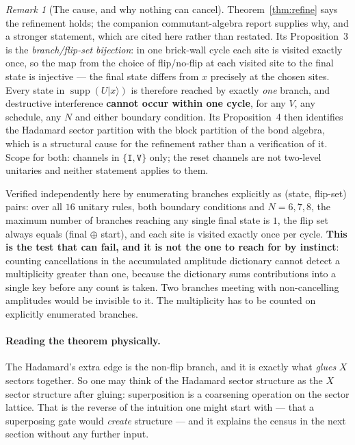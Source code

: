 \documentclass[11pt]{article}
\newcommand{\rt}[1]{\texttt{#1}}
\providecommand{\ket}[1]{|#1\rangle}
\theoremstyle{plain}
\theoremstyle{remark}
\newtheorem{remark}{Remark}
\begin{document}
\begin{remark}[The cause, and why nothing can cancel]
\label{rem:bijection}
Theorem~\ref{thm:refine} says the refinement holds; the companion
commutant-algebra report supplies why, and a stronger statement, which are cited
here rather than restated. Its Proposition~3 is the \emph{branch/flip-set
bijection}: in one brick-wall cycle each site is visited exactly once, so the
map from the choice of flip/no-flip at each visited site to the final state is
injective --- the final state differs from $x$ precisely at the chosen sites.
Every state in $\operatorname{supp}(U\ket{x})$ is therefore reached by exactly
\emph{one} branch, and destructive interference \textbf{cannot occur within one
cycle}, for any $V$, any schedule, any $N$ and either boundary condition. Its
Proposition~4 then identifies the Hadamard sector partition with the block
partition of the bond algebra, which is a structural cause for the refinement
rather than a verification of it. Scope for both: channels in
$\{\rt{I},\rt{V}\}$ only; the reset channels are not two-level unitaries and
neither statement applies to them.

Verified independently here by enumerating branches explicitly as
(state, flip-set) pairs: over all $16$ unitary rules, both boundary conditions
and $N=6,7,8$, the maximum number of branches reaching any single final state is
$1$, the flip set always equals (final $\oplus$ start), and each site is visited
exactly once per cycle. \textbf{This is the test that can fail, and it is not the
one to reach for by instinct}: counting cancellations in the accumulated
amplitude dictionary cannot detect a multiplicity greater than one, because the
dictionary sums contributions into a single key before any count is taken. Two
branches meeting with non-cancelling amplitudes would be invisible to it. The
multiplicity has to be counted on explicitly enumerated branches.
\end{remark}

\paragraph{Reading the theorem physically.} The Hadamard's extra edge is the
non-flip branch, and it is exactly what \emph{glues} $X$ sectors together. So one
may think of the Hadamard sector structure as the $X$ sector structure after
gluing: superposition is a coarsening operation on the sector lattice. That is
the reverse of the intuition one might start with --- that a superposing gate
would \emph{create} structure --- and it explains the census in the next section
without any further input.
\end{document}

